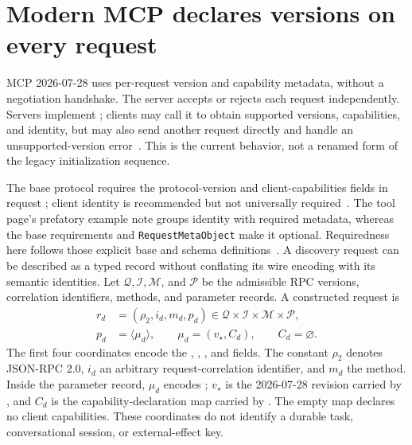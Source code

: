 \section{Modern MCP declares versions on every request}\label{sec:C19:versioning}
MCP 2026-07-28 uses per-request version and capability metadata, without a negotiation handshake. The server accepts or rejects each request independently. Servers implement ; clients may call it to obtain supported versions, capabilities, and identity, but may also send another request directly and handle an unsupported-version error~\cite{mcp2026compat,mcp2026discover}. This is the current behavior, not a renamed form of the legacy initialization sequence.

The base protocol requires the protocol-version and client-capabilities fields in request ; client identity is recommended but not universally required~\cite{mcp2026base}. The tool page's prefatory example note groups identity with required metadata, whereas the base requirements and \texttt{RequestMetaObject} make it optional. Requiredness here follows those explicit base and schema definitions~\cite{mcp2026tools,mcp2026schema}. A discovery request can be described as a typed record without conflating its wire encoding with its semantic identities. Let $\mathcal Q,\mathcal I,\mathcal M$, and $\mathcal P$ be the admissible RPC versions, correlation identifiers, methods, and parameter records. A constructed request is
\begin{equation}
\begin{aligned}
 r_d&=(\rho_2,i_d,m_d,p_d)
       \in\mathcal Q\times\mathcal I\times\mathcal M\times\mathcal P,\\
 p_d&=\langle\mu_d\rangle,\qquad
 \mu_d=(v_\star,C_d),\qquad C_d=\varnothing.
\end{aligned}
\label{eq:C19:discovery_request_record}
\end{equation}
The first four coordinates encode the , , , and  fields. The constant $\rho_2$ denotes JSON-RPC 2.0, $i_d$ an arbitrary request-correlation identifier, and $m_d$ the  method. Inside the parameter record, $\mu_d$ encodes ; $v_\star$ is the 2026-07-28 revision carried by , and $C_d$ is the capability-declaration map carried by . The empty map declares no client capabilities. These coordinates do not identify a durable task, conversational session, or external-effect key.

